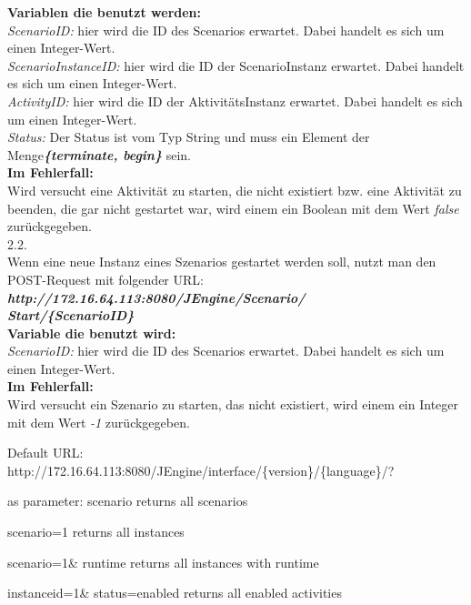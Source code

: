 \begin{enumerate}
\textbf{Variablen die benutzt werden:}\\
\textit{ScenarioID:} hier wird die ID des Scenarios erwartet. Dabei handelt es sich um einen Integer-Wert.\\
\textit{ScenarioInstanceID:} hier wird die ID der ScenarioInstanz erwartet. Dabei handelt es sich um einen Integer-Wert.\\
\textit{ActivityID:} hier wird die ID der AktivitätsInstanz erwartet. Dabei handelt es sich um einen Integer-Wert.\\
\textit{Status:} Der Status ist vom Typ String und muss ein Element der Menge\textbf{\textit{\{terminate, begin\}}} sein.\\

\textbf{Im Fehlerfall:}\\
Wird versucht eine Aktivität zu starten, die nicht existiert bzw. eine Aktivität zu beenden, die gar nicht gestartet war, wird einem ein Boolean mit dem Wert \textit{false} zurückgegeben.\\

2.2.\\ Wenn eine neue Instanz eines Szenarios gestartet werden soll, nutzt man den POST-Request mit folgender URL:\\
\textit{\textbf{http://172.16.64.113:8080/JEngine/Scenario/\\Start/\{ScenarioID\}}}\\

\textbf{Variable die benutzt wird:}\\
\textit{ScenarioID:} hier wird die ID des Scenarios erwartet. Dabei handelt es sich um einen Integer-Wert.\\

\textbf{Im Fehlerfall:}\\
Wird versucht ein Szenario zu starten, das nicht existiert, wird einem ein Integer mit dem Wert \textit{-1} zurückgegeben.\\

\end{enumerate}


Default URL:
http://172.16.64.113:8080/JEngine/interface/\{version\}/\{language\}/?

as parameter:
scenario
returns all scenarios
 
scenario=1
returns all instances

scenario=1\& runtime
returns all instances with runtime

instanceid=1\& status=enabled
returns all enabled activities

